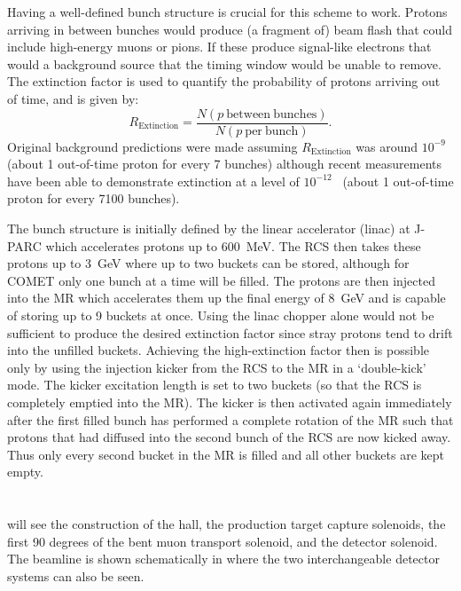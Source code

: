 Having a well-defined bunch structure is crucial for this scheme to work. 
Protons arriving in between bunches would produce (a fragment of) beam flash that could include high-energy muons or pions.   
If these produce signal-like electrons that would a background source that the timing window would be unable to remove.
The extinction factor is used to quantify the probability of protons arriving out of time, and is given by:
\begin{equation}
	R_\mathrm{Extinction}=\frac{N(p~\mathrm{between~bunches})}{N(p~\mathrm{per~bunch})}.
\end{equation}
Original background predictions were made assuming $R_\mathrm{Extinction}$ was around $10^{-9}$~\cite{CDRphase2} (about 1 out-of-time proton for every 7 \phaseI bunches) although recent measurements have been able to demonstrate extinction at a level of $10^{-12}$~\cite{TDR2016} (about 1 out-of-time proton for every 7100 \phaseI bunches).

The bunch structure is initially defined by the linear accelerator (linac) at J-PARC which accelerates protons up to 600~MeV.
The \ac{RCS} then takes these protons up to 3~GeV where up to two buckets can be stored, although for COMET only one bunch at a time will be filled.
The protons are then injected into the \ac{MR} which accelerates them up the final energy of 8~GeV and is capable of storing up to 9 buckets at once.
Using the linac chopper alone would not be sufficient to produce the desired extinction factor since stray protons tend to drift into the unfilled buckets.
Achieving the high-extinction factor then is possible only by using the injection kicker from the \ac{RCS} to the \ac{MR} in a `double-kick' mode.
The kicker excitation length is set to two buckets (so that the \ac{RCS} is completely emptied into the \ac{MR}).  
The kicker is then activated again immediately after the first filled bunch has performed a complete rotation of the \ac{MR} such that protons that had diffused into the second bunch of the \ac{RCS} are now kicked away.
Thus only every second bucket in the \ac{MR} is filled and all other buckets are kept empty.

\section{\COMET \phaseI}
\phaseI will see the construction of the \COMET hall, the production target capture solenoids, the first 90 degrees of the bent muon transport solenoid, and the detector solenoid.  
The beamline is shown schematically in  where the two interchangeable detector systems can also be seen.

